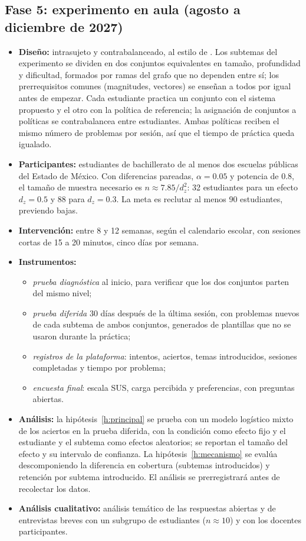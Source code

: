 \documentclass[12pt]{article}
\theoremstyle{definition}
\begin{document}
\subsection{Fase 5: experimento en aula (agosto a diciembre de 2027)}

\begin{itemize}
\item \textbf{Diseño:} intrasujeto y contrabalanceado, al estilo de \citet{lindsey2014}. Los subtemas del experimento se dividen en dos conjuntos equivalentes en tamaño, profundidad y dificultad, formados por ramas del grafo que no dependen entre sí; los prerrequisitos comunes (magnitudes, vectores) se enseñan a todos por igual antes de empezar. Cada estudiante practica un conjunto con el sistema propuesto y el otro con la política de referencia; la asignación de conjuntos a políticas se contrabalancea entre estudiantes. Ambas políticas reciben el mismo número de problemas por sesión, así que el tiempo de práctica queda igualado.
\item \textbf{Participantes:} estudiantes de bachillerato de al menos dos escuelas públicas del Estado de México. Con diferencias pareadas, $\alpha=0.05$ y potencia de 0.8, el tamaño de muestra necesario es $n\approx7.85/d_z^2$: 32 estudiantes para un efecto $d_z=0.5$ y 88 para $d_z=0.3$. La meta es reclutar al menos 90 estudiantes, previendo bajas.
\item \textbf{Intervención:} entre 8 y 12 semanas, según el calendario escolar, con sesiones cortas de 15 a 20 minutos, cinco días por semana.
\item \textbf{Instrumentos:}
\begin{itemize}
\item \emph{prueba diagnóstica} al inicio, para verificar que los dos conjuntos parten del mismo nivel;
\item \emph{prueba diferida} 30 días después de la última sesión, con problemas nuevos de cada subtema de ambos conjuntos, generados de plantillas que no se usaron durante la práctica;
\item \emph{registros de la plataforma}: intentos, aciertos, temas introducidos, sesiones completadas y tiempo por problema;
\item \emph{encuesta final}: escala SUS, carga percibida y preferencias, con preguntas abiertas.
\end{itemize}
\item \textbf{Análisis:} la hipótesis~\ref{h:principal} se prueba con un modelo logístico mixto de los aciertos en la prueba diferida, con la condición como efecto fijo y el estudiante y el subtema como efectos aleatorios; se reportan el tamaño del efecto y su intervalo de confianza. La hipótesis~\ref{h:mecanismo} se evalúa descomponiendo la diferencia en cobertura (subtemas introducidos) y retención por subtema introducido. El análisis se prerregistrará antes de recolectar los datos.
\item \textbf{Análisis cualitativo:} análisis temático de las respuestas abiertas y de entrevistas breves con un subgrupo de estudiantes ($n\approx10$) y con los docentes participantes.
\end{itemize}
\end{document}

